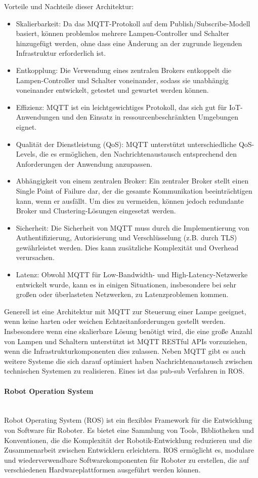 \documentclass[../vs-script-first-v01.tex]{subfiles}
\begin{document}
Vorteile und Nachteile dieser Architektur: 
\begin{itemize}
\item Skalierbarkeit: Da das MQTT-Protokoll auf dem Publish/Subscribe-Modell basiert, können problemlos mehrere Lampen-Controller und Schalter hinzugefügt werden, ohne dass eine Änderung an der zugrunde liegenden Infrastruktur erforderlich ist.
\item Entkopplung: Die Verwendung eines zentralen Brokers entkoppelt die Lampen-Controller und Schalter voneinander, sodass sie unabhängig voneinander entwickelt, getestet und gewartet werden können.
\item Effizienz: MQTT ist ein leichtgewichtiges Protokoll, das sich gut für IoT-Anwendungen und den Einsatz in ressourcenbeschränkten Umgebungen eignet.
\item Qualität der Dienstleistung (QoS): MQTT unterstützt unterschiedliche QoS-Levels, die es ermöglichen, den Nachrichtenaustausch entsprechend den Anforderungen der Anwendung anzupassen.
\item Abhängigkeit von einem zentralen Broker: Ein zentraler Broker stellt einen Single Point of Failure dar, der die gesamte Kommunikation beeinträchtigen kann, wenn er ausfällt. Um dies zu vermeiden, können jedoch redundante Broker und Clustering-Lösungen eingesetzt werden.
\item Sicherheit: Die Sicherheit von MQTT muss durch die Implementierung von Authentifizierung, Autorisierung und Verschlüsselung (z.B. durch TLS) gewährleistet werden. Dies kann zusätzliche Komplexität und Overhead verursachen.
\item Latenz: Obwohl MQTT für Low-Bandwidth- und High-Latency-Netzwerke entwickelt wurde, kann es in einigen Situationen, insbesondere bei sehr großen oder überlasteten Netzwerken, zu Latenzproblemen kommen.
\end{itemize}

Generell ist eine Architektur mit MQTT zur Steuerung einer Lampe geeignet, wenn keine harten oder weichen Echtzeitanforderungen gestellt werden. Insbesondere wenn eine skalierbare Lösung benötigt wird, die eine große Anzahl von Lampen und Schaltern unterstützt ist MQTT RESTful APIs vorzuziehen, wenn die Infrastrukturkomponenten dies zulassen. 
Neben MQTT gibt es auch weitere Systeme die sich darauf optimiert haben Nachrichtenaustausch zwischen technischen Systemen zu realisieren. Eines ist das pub-sub Verfahren in ROS. 
\paragraph{Robot Operation System\\\\}
Robot Operating System (ROS) ist ein flexibles Framework für die Entwicklung von Software für Roboter. Es bietet eine Sammlung von Tools, Bibliotheken und Konventionen, die die Komplexität der Robotik-Entwicklung reduzieren und die Zusammenarbeit zwischen Entwicklern erleichtern. ROS ermöglicht es, modulare und wiederverwendbare Softwarekomponenten für Roboter zu erstellen, die auf verschiedenen Hardwareplattformen ausgeführt werden können.
\end{document}
